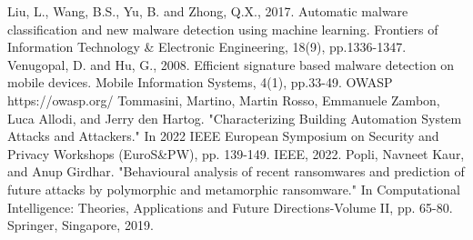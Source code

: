 \documentclass[conference]{IEEEtran}
\begin{document}
\begin{thebibliography}{00}
 Liu, L., Wang, B.S., Yu, B. and Zhong, Q.X., 2017. Automatic malware classification and new malware detection using machine learning. Frontiers of Information Technology \& Electronic Engineering, 18(9), pp.1336-1347.
 Venugopal, D. and Hu, G., 2008. Efficient signature based malware detection on mobile devices. Mobile Information Systems, 4(1), pp.33-49.
 OWASP https://owasp.org/
 Tommasini, Martino, Martin Rosso, Emmanuele Zambon, Luca Allodi, and Jerry den Hartog. "Characterizing Building Automation System Attacks and Attackers." In 2022 IEEE European Symposium on Security and Privacy Workshops (EuroS\&PW), pp. 139-149. IEEE, 2022.
 Popli, Navneet Kaur, and Anup Girdhar. "Behavioural analysis of recent ransomwares and prediction of future attacks by polymorphic and metamorphic ransomware." In Computational Intelligence: Theories, Applications and Future Directions-Volume II, pp. 65-80. Springer, Singapore, 2019.
\end{thebibliography}
\end{document}
